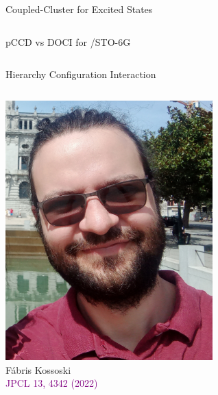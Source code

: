 \documentclass[aspectratio=169,9pt]{beamer}
\newcommand{\pub}[1]{{\small \textcolor{purple}{#1}}}
\begin{document}
\begin{frame}{Coupled-Cluster for Excited States}
\begin{columns}
\begin{column}{0.40\textwidth}
\begin{block}{pCCD vs DOCI for /STO-6G}
                        \end{block}
                \end{column}
        \end{columns}

\end{frame}


\begin{frame}{Hierarchy Configuration Interaction}

        \begin{columns}
        \begin{column}{0.25\textwidth}
        \centering
\includegraphics[width=0.6\textwidth]{fig/Fabris_2021.png}
\\
Fábris Kossoski
\\
\bigskip
        \centering
	\pub{JPCL 13, 4342 (2022)}
        \end{column}


\end{columns}
\end{frame}
\end{document}
